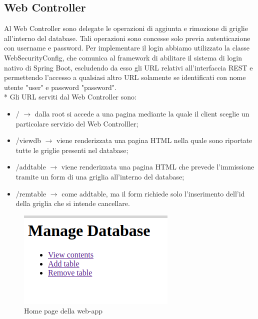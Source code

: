 \subsection{Web Controller}
Al Web Controller sono delegate le operazioni di aggiunta e rimozione di griglie all'interno del database. Tali operazioni sono concesse solo previa autenticazione con username e password. Per implementare il login abbiamo utilizzato la classe WebSecurityConfig, che comunica al framework di abilitare il sistema di login nativo di Spring Boot, escludendo da esso gli URL relativi all'interfaccia REST e permettendo l'accesso a qualsiasi altro URL solamente se identificati con nome utente "user" e password "password".\\*
Gli URL serviti dal Web Controller sono:
\begin{itemize}
	\item / $\rightarrow$ dalla root si accede a una pagina mediante la quale il client sceglie un particolare servizio del Web Controlller;

	
	\item /viewdb $\rightarrow$ viene renderizzata una pagina HTML nella quale sono riportate tutte le griglie presenti nel database;

	\item /addtable $\rightarrow$ viene renderizzata una pagina HTML che prevede l'immissione tramite un form di una griglia all'interno del database;
	
	\item /remtable $\rightarrow$ come addtable, ma il form richiede solo l'inserimento dell'id della griglia che si intende cancellare.
\end{itemize}
\newpage
	\begin{figure}[ht]
	\centering
	\includegraphics[width=0.7\linewidth]{Images/home}
	\caption{Home page della web-app}
	\label{fig:home}
\end{figure}
